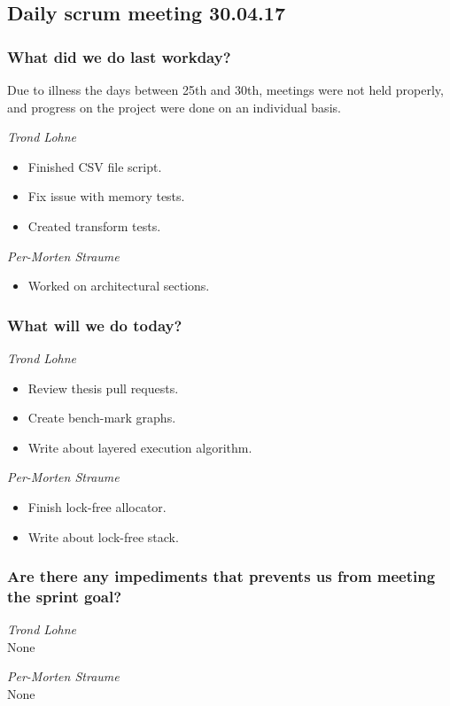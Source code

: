 \documentclass{article}
\begin{document}
\begin{center}
\subsection*{Daily scrum meeting 30.04.17}
\end{center}
\bigskip


\subsubsection*{What did we do last workday?}
Due to illness the days between 25th and 30th,
meetings were not held properly, and progress on the
project were done on an individual basis.

\noindent\textit{Trond Lohne}
\begin{itemize}
	\item
	Finished CSV file script.

	\item
	Fix issue with memory tests.

	\item
	Created transform tests.
\end{itemize}

\medskip

\noindent\textit{Per-Morten Straume}
\begin{itemize}
	\item
    Worked on architectural sections.
\end{itemize}


\subsubsection*{What will we do today?}

\noindent\textit{Trond Lohne}
\begin{itemize}
	\item
	Review thesis pull requests.

	\item
	Create bench-mark graphs.

	\item
	Write about layered execution algorithm.
\end{itemize}

\medskip

\noindent\textit{Per-Morten Straume}
\begin{itemize}
	\item
	Finish lock-free allocator.

	\item
	Write about lock-free stack.
\end{itemize}


\subsubsection*{Are there any impediments that prevents us from meeting the sprint goal?}

\noindent\textit{Trond Lohne}\\
None

\medskip

\noindent\textit{Per-Morten Straume}\\
None
\end{document}
